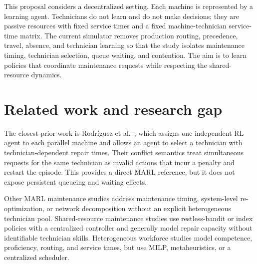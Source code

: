 \documentclass[11pt]{article}
\begin{document}
This proposal considers a decentralized setting. Each machine is represented by a learning agent. Technicians do not learn and do not make decisions; they are passive resources with fixed service times and a fixed machine-technician service-time matrix. The current simulator removes production routing, precedence, travel, absence, and technician learning so that the study isolates maintenance timing, technician selection, queue waiting, and contention. The aim is to learn policies that coordinate maintenance requests while respecting the shared-resource dynamics.

\section{Related work and research gap}

The closest prior work is Rodríguez et al.~\cite{rodriguez2022}, which assigns one independent RL agent to each parallel machine and allows an agent to select a technician with technician-dependent repair times. Their conflict semantics treat simultaneous requests for the same technician as invalid actions that incur a penalty and restart the episode. This provides a direct MARL reference, but it does not expose persistent queueing and waiting effects.

Other MARL maintenance studies address maintenance timing, system-level re-optimization, or network decomposition without an explicit heterogeneous technician pool. Shared-resource maintenance studies use restless-bandit or index policies with a centralized controller and generally model repair capacity without identifiable technician skills. Heterogeneous workforce studies model competence, proficiency, routing, and service times, but use MILP, metaheuristics, or a centralized scheduler.
\end{document}
